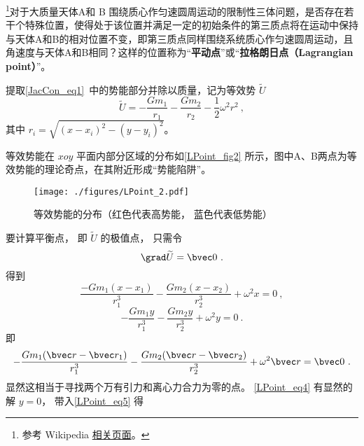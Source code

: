 
\begin{issues}
\issueTODO
\end{issues}


\footnote{参考 Wikipedia \href{https://en.wikipedia.org/wiki/Lagrange_point}{相关页面}。}对于大质量天体A和 B 围绕质心作匀速圆周运动的限制性三体问题，是否存在若干个特殊位置，使得处于该位置并满足一定的初始条件的第三质点将在运动中保持与天体A和B的相对位置不变，即第三质点同样围绕系统质心作匀速圆周运动，且角速度与天体A和B相同？这样的位置称为“\textbf{平动点}”或“\textbf{拉格朗日点（Lagrangian point）}”。

提取\autoref{JacCon_eq1}~中的势能部分并除以质量，记为等效势 $\widetilde{U}$ 
\begin{equation}
\widetilde{U} = -\frac{Gm_1}{r_1} -\frac{Gm_2}{r_2} -\frac{1}{2}\omega^2 r^2~,
\end{equation}
其中 $r_i = \sqrt{(x - x_i)^2 - (y - y_i)^2}$。

等效势能在 $xoy$ 平面内部分区域的分布如\autoref{LPoint_fig2} 所示，图中A、B两点为等效势能的理论奇点，在其附近形成“势能陷阱”。 
\begin{figure}[ht]
\centering
\texttt{[image: ./figures/LPoint\_2.pdf]}
\caption{等效势能的分布（红色代表高势能， 蓝色代表低势能）} \label{LPoint_fig2}
\end{figure}

要计算平衡点， 即 $\widetilde{U}$ 的极值点， 只需令
\begin{equation}
\grad \widetilde{U} = \bvec 0~.
\end{equation}
得到
\begin{equation}\label{LPoint_eq5}
\frac{-Gm_1(x-x_1)}{r_1^3} - \frac{Gm_2(x-x_2)}{r_2^3} + \omega^2 x = 0~,
\end{equation}
\begin{equation}\label{LPoint_eq4}
-\frac{Gm_1 y}{r_1^3} - \frac{Gm_2 y}{r_2^3} + \omega^2 y = 0~.
\end{equation}
即
\begin{equation}
-\frac{Gm_1(\bvec r - \bvec r_1)}{r_1^3} - \frac{Gm_2(\bvec r - \bvec r_2)}{r_2^3} + \omega^2 \bvec r = \bvec 0~.
\end{equation}
显然这相当于寻找两个万有引力和离心力合力为零的点。 \autoref{LPoint_eq4} 有显然的解 $y = 0$， 带入\autoref{LPoint_eq5} 得



